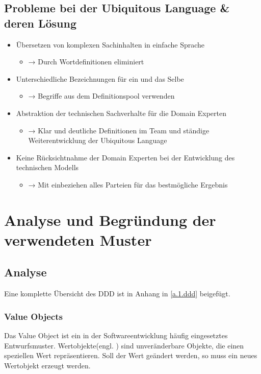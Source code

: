 		\subsection{Probleme bei der Ubiquitous Language \& deren Lösung \cite{ubiquitousLanguage.medium}}
		\begin{itemize}
			\item Übersetzen von komplexen Sachinhalten in einfache Sprache
			\begin{itemize}
				\item[] → Durch Wortdefinitionen eliminiert
			\end{itemize}
			\item Unterschiedliche Bezeichnungen für ein und das Selbe
			\begin{itemize}
				\item[] → Begriffe aus dem Definitionspool verwenden
			\end{itemize}
			\item Abstraktion der technischen Sachverhalte für die Domain Experten
			\begin{itemize}
				\item[] → Klar und deutliche Definitionen im Team und ständige Weiterentwicklung der Ubiquitous Language
			\end{itemize}
			\item Keine Rücksichtnahme der Domain Experten bei der Entwicklung des technischen Modells
			\begin{itemize}
				\item[] → Mit einbeziehen alles Parteien für das bestmögliche Ergebnis
			\end{itemize}
		\end{itemize}
	
	\section{Analyse und Begründung der verwendeten Muster}
		
		\subsection{Analyse}
		Eine komplette Übersicht des \acl{DDD} ist in Anhang in \cref{a.1.ddd} beigefügt.
			
			\subsubsection{Value Objects \cite{valueObjects.medium}} \label{1.va}
			Das Value Object ist ein in der Softwareentwicklung häufig eingesetztes Entwurfsmuster. Wertobjekte(engl. ) sind unveränderbare Objekte, die einen speziellen Wert repräsentieren. Soll der Wert geändert werden, so muss ein neues Wertobjekt erzeugt werden.
			
